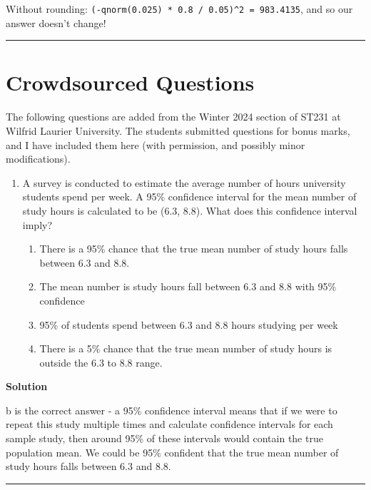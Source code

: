 \documentclass[
  letterpaper,
  DIV=11,
  numbers=noendperiod,
  oneside]{scrreprt}
\providecommand{\tightlist}{%
  \setlength{\itemsep}{0pt}\setlength{\parskip}{0pt}}\usepackage{longtable,booktabs,array}
\begin{document}
Without rounding:
\texttt{(-qnorm(0.025)\ *\ 0.8\ /\ 0.05)\^{}2\ =\ 983.4135}, and so our
answer doesn't change!

\begin{center}\rule{0.5\linewidth}{0.5pt}\end{center}

\hypertarget{crowdsourced-questions-6}{%
\section{Crowdsourced Questions}\label{crowdsourced-questions-6}}

The following questions are added from the Winter 2024 section of ST231
at Wilfrid Laurier University. The students submitted questions for
bonus marks, and I have included them here (with permission, and
possibly minor modifications).

\begin{enumerate}
\def\labelenumi{\arabic{enumi}.}
\tightlist
\item
  A survey is conducted to estimate the average number of hours
  university students spend per week. A 95\% confidence interval for the
  mean number of study hours is calculated to be (6.3, 8.8). What does
  this confidence interval imply?

  \begin{enumerate}
  \def\labelenumii{\alph{enumii}.}
  \tightlist
  \item
    There is a 95\% chance that the true mean number of study hours
    falls between 6.3 and 8.8.
  \item
    The mean number is study hours fall between 6.3 and 8.8 with 95\%
    confidence
  \item
    95\% of students spend between 6.3 and 8.8 hours studying per week
  \item
    There is a 5\% chance that the true mean number of study hours is
    outside the 6.3 to 8.8 range.
  \end{enumerate}
\end{enumerate}

\textbf{Solution}

b is the correct answer - a 95\% confidence interval means that if we
were to repeat this study multiple times and calculate confidence
intervals for each sample study, then around 95\% of these intervals
would contain the true population mean. We could be 95\% confident that
the true mean number of study hours falls between 6.3 and 8.8.

\begin{center}\rule{0.5\linewidth}{0.5pt}\end{center}
\end{document}
